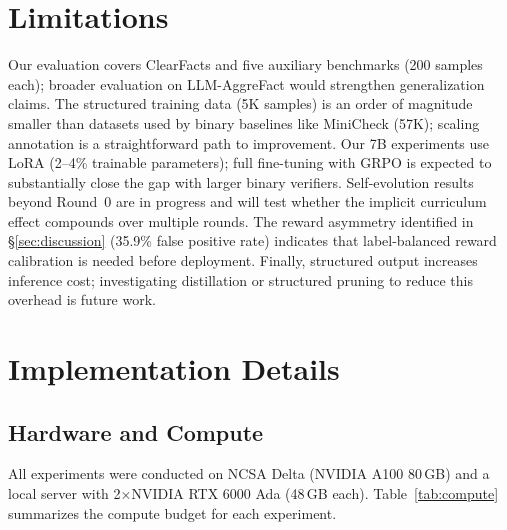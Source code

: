 \documentclass[11pt]{article}
\begin{document}
\section*{Limitations}
Our evaluation covers ClearFacts and five auxiliary benchmarks (200 samples each); broader evaluation on LLM-AggreFact \citep{tang2024llmaggrefact} would strengthen generalization claims.
The structured training data (5K samples) is an order of magnitude smaller than datasets used by binary baselines like MiniCheck (57K); scaling annotation is a straightforward path to improvement.
Our 7B experiments use LoRA (2--4\% trainable parameters); full fine-tuning with GRPO is expected to substantially close the gap with larger binary verifiers.
Self-evolution results beyond Round~0 are in progress and will test whether the implicit curriculum effect compounds over multiple rounds.
The reward asymmetry identified in \S\ref{sec:discussion} (35.9\% false positive rate) indicates that label-balanced reward calibration is needed before deployment.
Finally, structured output increases inference cost; investigating distillation or structured pruning to reduce this overhead is future work.





\appendix

\section{Implementation Details}
\label{app:impl}

\subsection{Hardware and Compute}

All experiments were conducted on NCSA Delta (NVIDIA A100 80\,GB) and a local server with 2$\times$NVIDIA RTX 6000 Ada (48\,GB each).
Table~\ref{tab:compute} summarizes the compute budget for each experiment.
\end{document}
